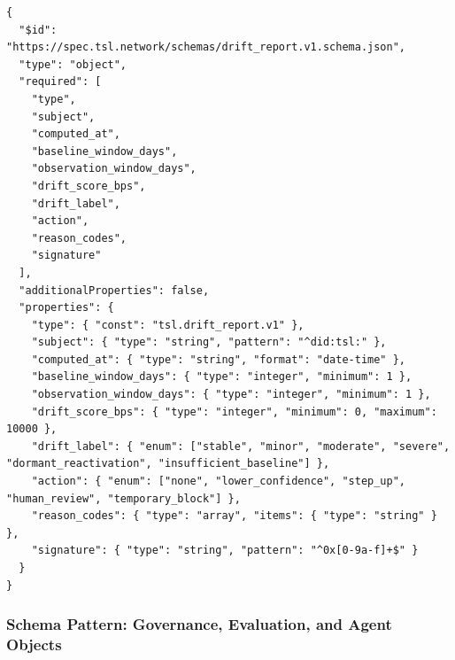 \documentclass[11pt]{article}
\begin{document}
\begin{lstlisting}[style=tslcode]
{
  "$id": "https://spec.tsl.network/schemas/drift_report.v1.schema.json",
  "type": "object",
  "required": [
    "type",
    "subject",
    "computed_at",
    "baseline_window_days",
    "observation_window_days",
    "drift_score_bps",
    "drift_label",
    "action",
    "reason_codes",
    "signature"
  ],
  "additionalProperties": false,
  "properties": {
    "type": { "const": "tsl.drift_report.v1" },
    "subject": { "type": "string", "pattern": "^did:tsl:" },
    "computed_at": { "type": "string", "format": "date-time" },
    "baseline_window_days": { "type": "integer", "minimum": 1 },
    "observation_window_days": { "type": "integer", "minimum": 1 },
    "drift_score_bps": { "type": "integer", "minimum": 0, "maximum": 10000 },
    "drift_label": { "enum": ["stable", "minor", "moderate", "severe", "dormant_reactivation", "insufficient_baseline"] },
    "action": { "enum": ["none", "lower_confidence", "step_up", "human_review", "temporary_block"] },
    "reason_codes": { "type": "array", "items": { "type": "string" } },
    "signature": { "type": "string", "pattern": "^0x[0-9a-f]+$" }
  }
}
\end{lstlisting}

\subsubsection{Schema Pattern: Governance, Evaluation, and Agent Objects}
\end{document}
